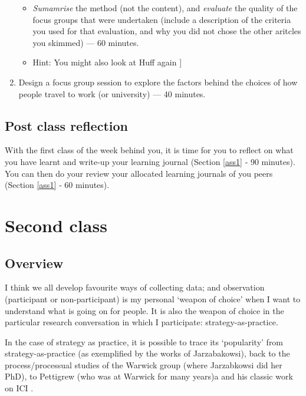 \documentclass[]{book}
\theoremstyle{definition}
\theoremstyle{definition}
\theoremstyle{definition}
\theoremstyle{remark}
\begin{document}
\begin{enumerate}
  \begin{itemize}
  \item
    \emph{Sumamrise} the method (not the content), and \emph{evaluate}
    the quality of the focus groups that were undertaken (include a
    description of the criteria you used for that evaluation, and why
    you did not chose the other aritcles you skimmed) --- 60 minutes.
  \item
    Hint: You might also look at Huff again \autocite[e.d.,][
    p.~251--268]{huff_2009_designingresearchpublication}{]}
  \end{itemize}
\item
  Design a focus group session to explore the factors behind the choices
  of how people travel to work (or university) --- 40 minutes.
\end{enumerate}

\hypertarget{post-class-reflection-2}{%
\subsection{Post class reflection}\label{post-class-reflection-2}}

With the first class of the week behind you, it is time for you to
reflect on what you have learnt and write-up your learning journal
(Section \ref{ass1} ‐ 90 minutes). You can then do your review your
allocated learning journals of you peers (Section \ref{ass1} ‐ 60
minutes).

\hypertarget{second-class-1}{%
\section*{Second class}\label{second-class-1}}

\hypertarget{overview-3}{%
\subsection*{Overview}\label{overview-3}}

I think we all develop favourite ways of collecting data; and
observation (participant or non-participant) is my personal `weapon of
choice' when I want to understand what is going on for people. It is
also the weapon of choice in the particular research conversation in
which I participate: strategy-as-practice.

In the case of strategy as practice, it is possible to trace its
`popularity' from strategy-as-practice (as exemplified by the works of
Jarzabakowsi), back to the process/processual studies of the Warwick
group (where Jarzabkowsi did her PhD), to Pettigrew (who was at Warwick
for many years)a and his classic work on ICI
\autocite{pettigrew_1985_awakinggiant}.
\end{document}
